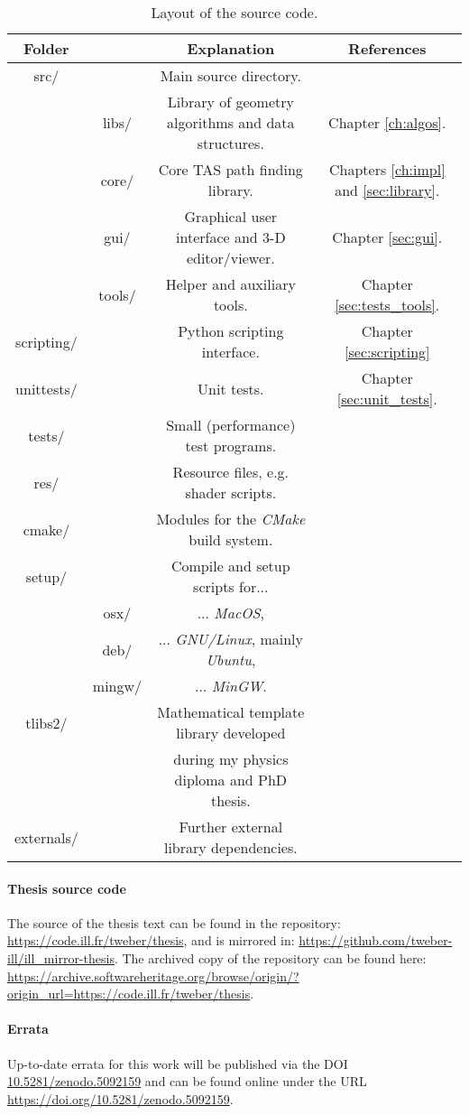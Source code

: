 \begin{table}[htb]
	\centering
	\begin{tabular}{|c c|c|c|}
		\hline
		\bf{Folder} & & \bf{Explanation} & \bf{References} \tabularnewline
		\hline
		src/ & & Main source directory. & \tabularnewline
		       & libs/ & Library of geometry algorithms and data structures. & Chapter \ref{ch:algos}. \tabularnewline
		       & core/ & Core TAS path finding library. & Chapters \ref{ch:impl} and \ref{sec:library}. \tabularnewline
		       & gui/ & Graphical user interface and 3-D editor/viewer. & Chapter \ref{sec:gui}. \tabularnewline
		       & tools/ & Helper and auxiliary tools. & Chapter \ref{sec:tests_tools}. \tabularnewline
		\hline
		scripting/ & & Python scripting interface. & Chapter \ref{sec:scripting} \tabularnewline
		\hline
		unittests/ & & Unit tests. & Chapter \ref{sec:unit_tests}. \tabularnewline
		\hline
		tests/ & & Small (performance) test programs. & \tabularnewline
		\hline
		res/ & & Resource files, e.g. shader scripts. & \tabularnewline
		\hline
		cmake/ & & Modules for the \textit{CMake} \cite{TODO} build system. & \tabularnewline
		\hline
		setup/ & & Compile and setup scripts for... & \tabularnewline
		\hline
		           & osx/ & ... \textit{MacOS}, & \tabularnewline
		           & deb/ & ... \textit{GNU/Linux}, mainly \textit{Ubuntu}, & \tabularnewline
		           & mingw/ & ... \textit{MinGW}. & \tabularnewline
		\hline
		tlibs2/ & & Mathematical template library developed  & \cite{Takin2016, Takin2017, Takin2021, DiplomaWeber, PhDWeber} \tabularnewline
		           & & during my physics diploma and PhD thesis. & \tabularnewline
		\hline
		externals/ & & Further external library dependencies. & \tabularnewline
		\hline
	\end{tabular}
	\caption[Source code layout.]{Layout of the source code.}
	\label{tab:sourcelayout}
\end{table}



\paragraph{Thesis source code}
The source of the thesis text can be found in the repository:
\url{https://code.ill.fr/tweber/thesis}, and is mirrored in:
\url{https://github.com/tweber-ill/ill_mirror-thesis}.
The archived copy of the repository can be found here:
\url{https://archive.softwareheritage.org/browse/origin/?origin_url=https://code.ill.fr/tweber/thesis}.


\paragraph{Errata}
Up-to-date errata for this work will be published via the DOI
\href{https://doi.org/10.5281/zenodo.5092159}{10.5281/zenodo.5092159}
and can be found online under the URL \url{https://doi.org/10.5281/zenodo.5092159}.
